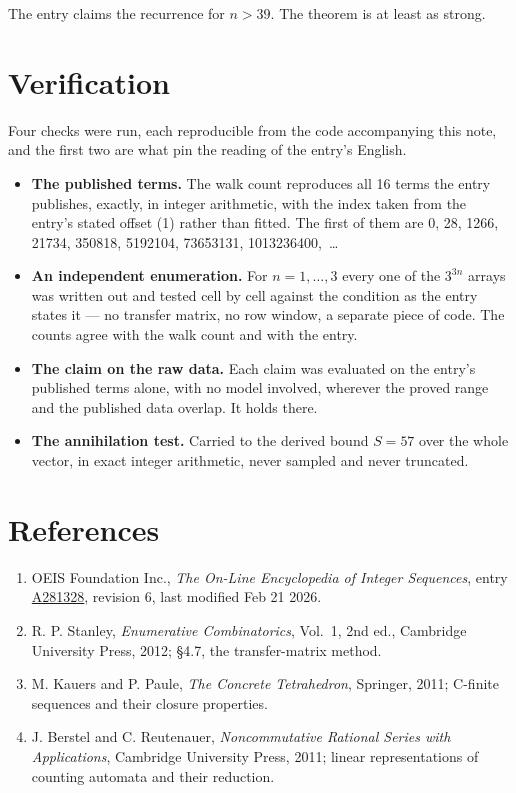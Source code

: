 \documentclass[11pt]{article}
\theoremstyle{definition}
\begin{document}
The entry claims the recurrence for $n > 39$. The theorem is at least as strong.

\section{Verification}

Four checks were run, each reproducible from the code accompanying this note, and the first two are what pin the reading of the entry's English.

\begin{itemize}

\item {\bfseries The published terms.} The walk count reproduces all 16 terms the entry publishes, exactly, in integer arithmetic, with the index taken from the entry's stated offset (1) rather than fitted. The first of them are 0, 28, 1266, 21734, 350818, 5192104, 73653131, 1013236400,~\dots

\item {\bfseries An independent enumeration.} For $n = 1,\dots,3$ every one of the $3^{3n}$ arrays was written out and tested cell by cell against the condition as the entry states it --- no transfer matrix, no row window, a separate piece of code. The counts agree with the walk count and with the entry.

\item {\bfseries The claim on the raw data.} Each claim was evaluated on the entry's published terms alone, with no model involved, wherever the proved range and the published data overlap. It holds there.

\item {\bfseries The annihilation test.} Carried to the derived bound $S = 57$ over the whole vector, in exact integer arithmetic, never sampled and never truncated.

\end{itemize}

\section{References}

\begin{enumerate}

\item OEIS Foundation Inc., \emph{The On-Line Encyclopedia of Integer Sequences}, entry \href{https://oeis.org/A281328}{A281328}, revision 6, last modified Feb 21 2026.

\item R. P. Stanley, \emph{Enumerative Combinatorics}, Vol.~1, 2nd ed., Cambridge University Press, 2012; \S4.7, the transfer-matrix method.

\item M. Kauers and P. Paule, \emph{The Concrete Tetrahedron}, Springer, 2011; C-finite sequences and their closure properties.

\item J. Berstel and C. Reutenauer, \emph{Noncommutative Rational Series with Applications}, Cambridge University Press, 2011; linear representations of counting automata and their reduction.

\end{enumerate}
\end{document}
